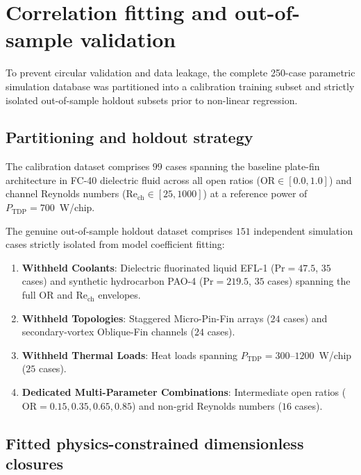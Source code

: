 
\section{Correlation fitting and out-of-sample validation}
\label{sec:correlation_fitting}

To prevent circular validation and data leakage, the complete 250-case parametric simulation database was partitioned into a calibration training subset and strictly isolated out-of-sample holdout subsets prior to non-linear regression.

\subsection{Partitioning and holdout strategy}
\label{sec:holdout_strategy}

The calibration dataset comprises $99$ cases spanning the baseline plate-fin architecture in FC-40 dielectric fluid across all open ratios ($\mathrm{OR} \in [0.0, 1.0]$) and channel Reynolds numbers ($\mathrm{Re}_{\mathrm{ch}} \in [25, 1000]$) at a reference power of $P_{\mathrm{TDP}} = 700$~W/chip.

The genuine out-of-sample holdout dataset comprises $151$ independent simulation cases strictly isolated from model coefficient fitting:
\begin{enumerate}
\item \textbf{Withheld Coolants}: Dielectric fluorinated liquid EFL-1 ($\mathrm{Pr} = 47.5$, $35$ cases) and synthetic hydrocarbon PAO-4 ($\mathrm{Pr} = 219.5$, $35$ cases) spanning the full $\mathrm{OR}$ and $\mathrm{Re}_{\mathrm{ch}}$ envelopes.
\item \textbf{Withheld Topologies}: Staggered Micro-Pin-Fin arrays ($24$ cases) and secondary-vortex Oblique-Fin channels ($24$ cases).
\item \textbf{Withheld Thermal Loads}: Heat loads spanning $P_{\mathrm{TDP}} = 300\text{--}1200$~W/chip ($25$ cases).
\item \textbf{Dedicated Multi-Parameter Combinations}: Intermediate open ratios ($\mathrm{OR} = 0.15, 0.35, 0.65, 0.85$) and non-grid Reynolds numbers ($16$ cases).
\end{enumerate}

\subsection{Fitted physics-constrained dimensionless closures}
\label{sec:fitted_equations}


